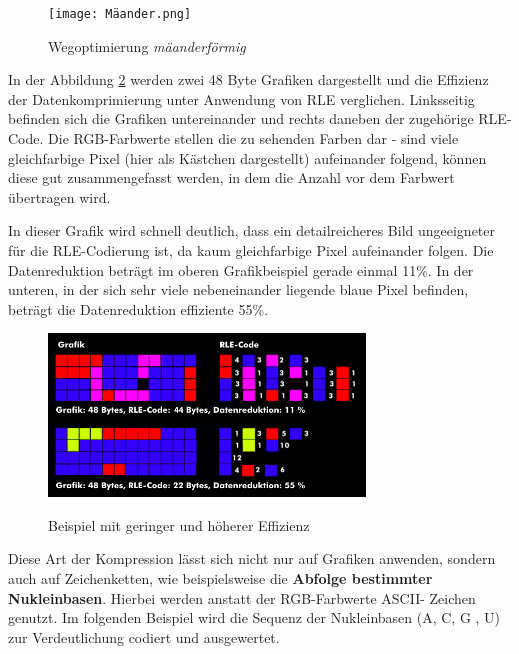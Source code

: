 \documentclass[11pt,a4paper,ngerman]{report}
\begin{document}
		 \begin{figure} [H]
			\begin{center}
				\texttt{[image: Mäander.png]}
				\caption{Wegoptimierung \textit{mäanderförmig}}
				\cite{kocerheiztech}
				\label{mäander}
			\end{center}
		\end{figure}
	  
		In der Abbildung \ref{Effizienz} werden zwei 48 Byte Grafiken dargestellt und die Effizienz der Datenkomprimierung unter Anwendung von RLE verglichen. Linksseitig befinden sich die Grafiken untereinander und rechts daneben der zugehörige RLE-Code. Die RGB-Farbwerte stellen die zu sehenden Farben dar - sind viele gleichfarbige Pixel (hier als Kästchen dargestellt) aufeinander folgend, können diese gut zusammengefasst werden, in dem die Anzahl vor dem Farbwert übertragen wird. 
			
		In dieser Grafik  wird  schnell deutlich, dass ein detailreicheres Bild ungeeigneter für die RLE-Codierung ist, da kaum gleichfarbige Pixel aufeinander folgen. Die Datenreduktion beträgt im oberen Grafikbeispiel gerade einmal 11\%. In der unteren, in der sich sehr viele nebeneinander liegende blaue Pixel befinden, beträgt die Datenreduktion effiziente 55\%.
				
		\begin{figure} [H]
				\begin{center}
						\includegraphics[width=0.75\textwidth]{g_h_Effizienz.png}
						\caption{Beispiel mit geringer und höherer Effizienz}
						\cite{ITWissen.info}
						\label{Effizienz}
					\end{center}
				\end{figure}
		

		Diese Art der Kompression lässt sich nicht nur auf Grafiken anwenden, sondern auch auf Zeichenketten, wie beispielsweise die \textbf{Abfolge bestimmter Nukleinbasen}. Hierbei werden anstatt der RGB-Farbwerte ASCII- Zeichen genutzt.  Im folgenden Beispiel wird die Sequenz der Nukleinbasen (A, C, G , U) zur Verdeutlichung codiert und ausgewertet.\cite{Juchim2021}
\end{document}
